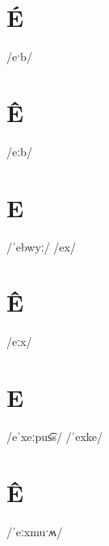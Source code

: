 \documentclass[10pt,a4paper,twoside]{book}
\begin{document}
\section*{É}

\begin{multicols}{3}
 {/eˑb/} {}
\end{multicols}

\section*{Ê}

\begin{multicols}{3}
 {/eːb/} {}
\end{multicols}

\section*{E}

\begin{multicols}{3}
 {/ˈebwyː/} {}
 {/ex/} {}
\end{multicols}

\section*{Ê}

\begin{multicols}{3}
 {/eːx/} {}
\end{multicols}

\section*{E}

\begin{multicols}{3}
 {/eˈxeːpus͡s/} {}
 {/ˈexke/} {}
\end{multicols}

\section*{Ê}

\begin{multicols}{3}
 {/ˈeːxmuˑʍ/} {}
\end{multicols}
\end{document}
